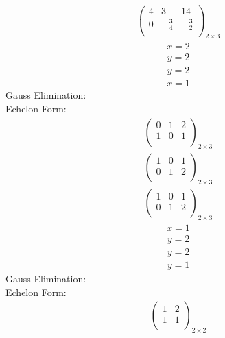 \documentclass{article}
\begin{document}
\begin{align*}
\left(
\begin{array}{cc|c}
4 & 3 & 14\\
0 & -\frac{3}{4} & -\frac{3}{2}\\
\end{array}
\right)_{2\times 3}
\end{align*}
\begin{align*}
x=2\end{align*}
\begin{align*}
y=2\end{align*}
\begin{align*}
y=2\end{align*}
\begin{align*}
x=1\end{align*}
Gauss Elimination:\\
Echelon Form:\\
\begin{align*}
\left(
\begin{array}{cc|c}
0 & 1 & 2\\
1 & 0 & 1\\
\end{array}
\right)_{2\times 3}
\end{align*}
\begin{align*}
\left(
\begin{array}{cc|c}
1 & 0 & 1\\
0 & 1 & 2\\
\end{array}
\right)_{2\times 3}
\end{align*}
\begin{align*}
\left(
\begin{array}{cc|c}
1 & 0 & 1\\
0 & 1 & 2\\
\end{array}
\right)_{2\times 3}
\end{align*}
\begin{align*}
x=1\end{align*}
\begin{align*}
y=2\end{align*}
\begin{align*}
y=2\end{align*}
\begin{align*}
y=1\end{align*}
Gauss Elimination:\\
Echelon Form:\\
\begin{align*}
\left(
\begin{array}{c|c}
1 & 2\\
1 & 1\\
\end{array}
\right)_{2\times 2}
\end{align*}
\end{document}
